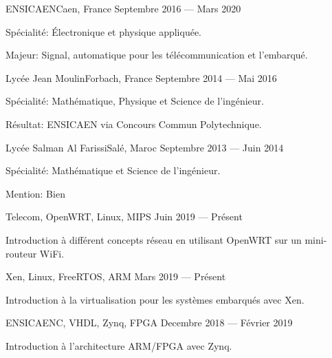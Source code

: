 \documentclass{faresume}
\begin{document}
\begin{column}[\leftcolumnwidth]

			{ENSICAEN}{Caen, France}
			{Septembre 2016 --- Mars 2020}
			{
				\begin{additems}
					\item Sp\'ecialit\'e: \'Electronique et physique appliqu\'ee.
					\item Majeur: Signal, automatique pour les t\'el\'ecommunication et l'embarqu\'e.
				\end{additems}
			}

			{Lyc\'ee Jean Moulin}{Forbach, France}
			{Septembre 2014 --- Mai 2016}
			{
				\begin{additems}
					\item Sp\'ecialit\'e: Math\'ematique, Physique et Science de l'ing\'enieur.
					\item R\'esultat: ENSICAEN via Concours Commun Polytechnique.
				\end{additems}
			}

			{Lyc\'ee Salman Al Farissi}{Sal\'e, Maroc}
			{Septembre 2013 --- Juin 2014}
			{
				\begin{additems}
					\item Sp\'ecialit\'e: Math\'ematique et Science de l'ing\'enieur.
					\item Mention: Bien
				\end{additems}
			}


			{}{Telecom, OpenWRT, Linux, MIPS}
			{Juin 2019 --- Pr\'esent}
			{
				\begin{additems}
					\item Introduction \`a diff\'erent concepts r\'eseau en utilisant OpenWRT sur un mini-routeur WiFi.
				\end{additems}
			}

			{}{Xen, Linux, FreeRTOS, ARM}
			{Mars 2019 --- Pr\'esent}
			{
				\begin{additems}
					\item Introduction \`a la virtualisation pour les syst\`emes embarqu\'es avec Xen.
				\end{additems}
			}

			{ENSICAEN}{C, VHDL, Zynq, FPGA}
			{Decembre 2018 --- F\'evrier 2019}
			{
				\begin{additems}
					\item Introduction \`a l'architecture ARM/FPGA avec Zynq.
				\end{additems}
			}


\end{column}
\end{document}
